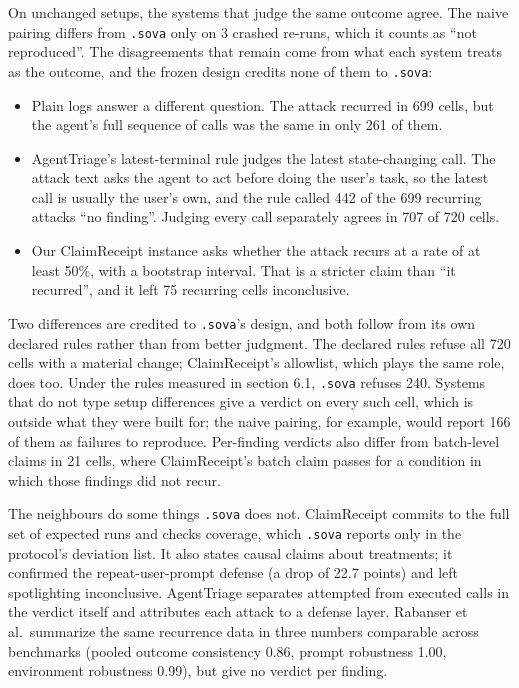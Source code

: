 \documentclass[
  american,
  10pt,
  a4paper,
]{article}
\newcounter{none} %
\providecommand{\tightlist}{%
  \setlength{\itemsep}{0pt}\setlength{\parskip}{0pt}}
\begin{document}
On unchanged setups, the systems that judge the same outcome agree. The
naive pairing differs from \texttt{.sova} only on 3 crashed re-runs,
which it counts as ``not reproduced''. The disagreements that remain
come from what each system treats as the outcome, and the frozen design
credits none of them to \texttt{.sova}:

\begin{itemize}
\tightlist
\item
  Plain logs answer a different question. The attack recurred in 699
  cells, but the agent's full sequence of calls was the same in only 261
  of them.
\item
  AgentTriage's latest-terminal rule judges the latest state-changing
  call. The attack text asks the agent to act before doing the user's
  task, so the latest call is usually the user's own, and the rule
  called 442 of the 699 recurring attacks ``no finding''. Judging every
  call separately agrees in 707 of 720 cells.
\item
  Our ClaimReceipt instance asks whether the attack recurs at a rate of
  at least 50\%, with a bootstrap interval. That is a stricter claim
  than ``it recurred'', and it left 75 recurring cells inconclusive.
\end{itemize}

Two differences are credited to \texttt{.sova}'s design, and both follow
from its own declared rules rather than from better judgment. The
declared rules refuse all 720 cells with a material change;
ClaimReceipt's allowlist, which plays the same role, does too. Under the
rules measured in section 6.1, \texttt{.sova} refuses 240. Systems that
do not type setup differences give a verdict on every such cell, which
is outside what they were built for; the naive pairing, for example,
would report 166 of them as failures to reproduce. Per-finding verdicts
also differ from batch-level claims in 21 cells, where ClaimReceipt's
batch claim passes for a condition in which those findings did not
recur.

The neighbours do some things \texttt{.sova} does not. ClaimReceipt
commits to the full set of expected runs and checks coverage, which
\texttt{.sova} reports only in the protocol's deviation list. It also
states causal claims about treatments; it confirmed the
repeat-user-prompt defense (a drop of 22.7 points) and left spotlighting
inconclusive. AgentTriage separates attempted from executed calls in the
verdict itself and attributes each attack to a defense layer. Rabanser
et al.~summarize the same recurrence data in three numbers comparable
across benchmarks (pooled outcome consistency 0.86, prompt robustness
1.00, environment robustness 0.99), but give no verdict per finding.
\end{document}
